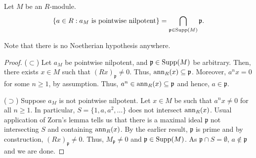 \begin{prop} \label{prop:pointwise-nilpotent-every-support-prime}
	Let $M$ be an $R$-module.
	\begin{equation*} 
		\{a \in R : a_{M} \text{ is pointwise nilpotent}\} = \bigcap_{\mathfrak{p} \in \operatorname{Supp}(M)} \mathfrak{p}.
	\end{equation*}
\end{prop}
Note that there is no Noetherian hypothesis anywhere.
\begin{proof} 
	($\subset$) Let $a_{M}$ be pointwise nilpotent, and $\mathfrak{p} \in \operatorname{Supp}(M)$ be arbitrary. Then, there exists $x \in M$ such that $(Rx)_{\mathfrak{p}} \neq 0$. Thus, $\operatorname{ann}_{R}(x) \subseteq \mathfrak{p}$. Moreover, $a^{n} x = 0$ for some $n \ge 1$, by assumption. Thus, $a^{n} \in \operatorname{ann}_{R}(x) \subseteq \mathfrak{p}$ and hence, $a \in \mathfrak{p}$.

	($\supset$) Suppose $a_{M}$ is not pointwise nilpotent. Let $x \in M$ be such that $a^{n} x \neq 0$ for all $n \ge 1$. In particular, $S = \{1, a, a^{2}, \ldots\}$ does not intersect $\operatorname{ann}_{R}(x)$. Usual application of Zorn's lemma tells us that there is a maximal ideal $\mathfrak{p}$ not intersecting $S$ and containing $\operatorname{ann}_{R}(x)$. By the earlier result, $\mathfrak{p}$ is prime and by construction, $(Rx)_{\mathfrak{p}} \neq 0$. Thus, $M_{\mathfrak{p}} \neq 0$ and $\mathfrak{p} \in \operatorname{Supp}(M)$. As $\mathfrak{p} \cap S = \emptyset$, $a \notin \mathfrak{p}$ and we are done.
\end{proof}

